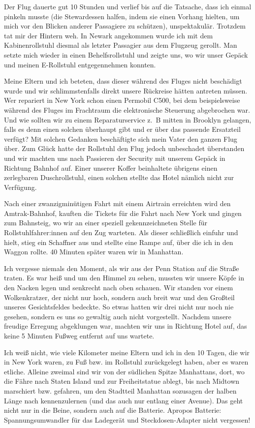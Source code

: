 \documentclass[fontsize=14pt,a4paper,headinclude,DIV=calc,automark]{scrbook}
\begin{document}
Der Flug dauerte gut 10 Stunden und verlief bis auf die Tatsache, dass ich einmal pinkeln musste (die Stewardessen halfen, indem sie einen Vorhang hielten, um mich vor den Blicken anderer Passagiere zu schützen), unspektakulär. Trotzdem tat mir der Hintern weh. In Newark angekommen wurde ich mit dem Kabinenrollstuhl diesmal als letzter Passagier aus dem Flugzeug gerollt. Man setzte mich wieder in einen Behelfsrollstuhl und zeigte uns, wo wir unser Gepäck und meinen E-Rollstuhl entgegennehmen konnten.

Meine Eltern und ich beteten, dass dieser während des Fluges nicht beschädigt wurde und wir schlimmstenfalls direkt unsere Rückreise hätten antreten müssen. Wer repariert in New York schon einen Permobil C500, bei dem beispielsweise während des Fluges im Frachtraum die elektronische Steuerung abgebrochen war. Und wie sollten wir zu einem Reparaturservice z.~B mitten in Brooklyn gelangen, falls es denn einen solchen überhaupt gibt und er über das passende Ersatzteil verfügt? Mit solchen Gedanken beschäftigte sich mein Vater den ganzen Flug über. Zum Glück hatte der Rollstuhl den Flug jedoch unbeschadet überstanden und wir machten uns nach Passieren der Security mit unserem Gepäck in Richtung Bahnhof auf. Einer unserer Koffer beinhaltete übrigens einen zerlegbaren Duschrollstuhl, einen solchen stellte das Hotel nämlich nicht zur Verfügung.

Nach einer zwanzigminütigen Fahrt mit einem Airtrain erreichten wird den Amtrak-Bahnhof, kauften die Tickets für die Fahrt nach New York und gingen zum Bahnsteig, wo wir an einer speziell gekennzeichneten Stelle für Rollstuhlfahrer:innen auf den Zug warteten. Als dieser schließlich einfuhr und hielt, stieg ein Schaffner aus und stellte eine Rampe auf, über die ich in den Waggon rollte. 40 Minuten später waren wir in Manhattan.

Ich vergesse niemals den Moment, als wir aus der Penn Station auf die Straße traten. Es war heiß und um den Himmel zu sehen, mussten wir unsere Köpfe in den Nacken legen und senkrecht nach oben schauen. Wir standen vor einem Wolkenkratzer, der nicht nur hoch, sondern auch breit war und den Großteil unseres Gesichtsfeldes bedeckte. So etwas hatten wir drei nicht nur noch nie gesehen, sondern es uns so gewaltig auch nicht vorgestellt. Nachdem unsere freudige Erregung abgeklungen war, machten wir uns in Richtung Hotel auf, das keine 5 Minuten Fußweg entfernt auf uns wartete.

Ich weiß nicht, wie viele Kilometer meine Eltern und ich in den 10 Tagen, die wir in New York waren, zu Fuß bzw. im Rollstuhl zurückgelegt haben, aber es waren etliche. Alleine zweimal sind wir von der südlichen Spitze Manhattans, dort, wo die Fähre nach Staten Island und zur Freiheitstatue ablegt, bis nach Midtown marschiert bzw. gefahren, um den Stadtteil Manhattan sozusagen der halben Länge nach kennenzulernen (und das auch nur entlang einer Avenue). Das geht nicht nur in die Beine, sondern auch auf die Batterie. Apropos Batterie: Spannungsumwandler für das Ladegerät und Steckdosen-Adapter nicht vergessen!
\end{document}
